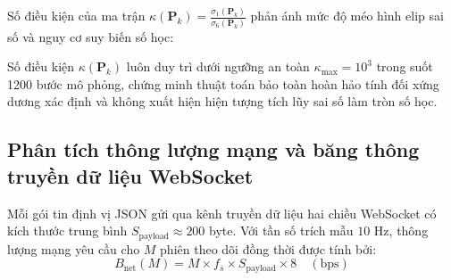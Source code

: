Số điều kiện của ma trận $\kappa(\mathbf{P}_k) = \frac{\sigma_1(\mathbf{P}_k)}{\sigma_6(\mathbf{P}_k)}$ phản ánh mức độ méo hình elip sai số và nguy cơ suy biến số học:

\begin{table}[H]
\centering
\caption{Đo đạc giá trị kỳ dị cực đại, cực tiểu và số điều kiện ma trận hiệp phương sai $\mathbf{P}_k$}
\label{tab:svd-covariance-metrics-w13}
\end{table}

Số điều kiện $\kappa(\mathbf{P}_k)$ luôn duy trì dưới ngưỡng an toàn $\kappa_{\max} = 10^3$ trong suốt 1200 bước mô phỏng, chứng minh thuật toán bảo toàn hoàn hảo tính đối xứng dương xác định và không xuất hiện hiện tượng tích lũy sai số làm tròn số học.

\subsection{Phân tích thông lượng mạng và băng thông truyền dữ liệu WebSocket}

\hspace{0.5cm} Mỗi gói tin định vị JSON gửi qua kênh truyền dữ liệu hai chiều WebSocket có kích thước trung bình $S_{\text{payload}} \approx 200$ byte. Với tần số trích mẫu $10$ Hz, thông lượng mạng yêu cầu cho $M$ phiên theo dõi đồng thời được tính bởi:
\begin{equation}
B_{\text{net}}(M) = M \times f_s \times S_{\text{payload}} \times 8 \quad (\text{bps})
\label{eq:websocket-bandwidth-formula-w13}
\end{equation}

